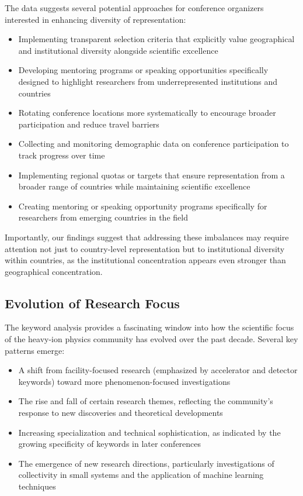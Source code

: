 \documentclass[a4paper,11pt]{article}
\begin{document}
The data suggests several potential approaches for conference organizers interested in enhancing diversity of representation:

\begin{itemize}
    \item Implementing transparent selection criteria that explicitly value geographical and institutional diversity alongside scientific excellence
    \item Developing mentoring programs or speaking opportunities specifically designed to highlight researchers from underrepresented institutions and countries
    \item Rotating conference locations more systematically to encourage broader participation and reduce travel barriers
    \item Collecting and monitoring demographic data on conference participation to track progress over time
    \item Implementing regional quotas or targets that ensure representation from a broader range of countries while maintaining scientific excellence
    \item Creating mentoring or speaking opportunity programs specifically for researchers from emerging countries in the field
\end{itemize}

Importantly, our findings suggest that addressing these imbalances may require attention not just to country-level representation but to institutional diversity within countries, as the institutional concentration appears even stronger than geographical concentration.

\subsection{Evolution of Research Focus}

The keyword analysis provides a fascinating window into how the scientific focus of the heavy-ion physics community has evolved over the past decade. Several key patterns emerge:

\begin{itemize}
    \item A shift from facility-focused research (emphasized by accelerator and detector keywords) toward more phenomenon-focused investigations
    \item The rise and fall of certain research themes, reflecting the community's response to new discoveries and theoretical developments
    \item Increasing specialization and technical sophistication, as indicated by the growing specificity of keywords in later conferences
    \item The emergence of new research directions, particularly investigations of collectivity in small systems and the application of machine learning techniques
\end{itemize}
\end{document}
